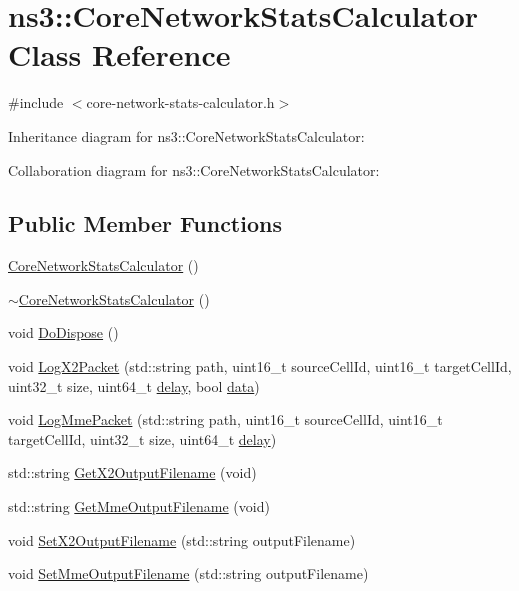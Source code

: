 \hypertarget{classns3_1_1CoreNetworkStatsCalculator}{}\section{ns3\+:\+:Core\+Network\+Stats\+Calculator Class Reference}
\label{classns3_1_1CoreNetworkStatsCalculator}


{\ttfamily \#include $<$core-\/network-\/stats-\/calculator.\+h$>$}



Inheritance diagram for ns3\+:\+:Core\+Network\+Stats\+Calculator\+:


Collaboration diagram for ns3\+:\+:Core\+Network\+Stats\+Calculator\+:
\subsection*{Public Member Functions}
\begin{DoxyCompactItemize}
\item 
\hyperlink{classns3_1_1CoreNetworkStatsCalculator_ad42faed58e88f2da64ee5d6feec4532d}{Core\+Network\+Stats\+Calculator} ()
\item 
\hyperlink{classns3_1_1CoreNetworkStatsCalculator_ae06dda03760bf6e5a90156b94318b368}{$\sim$\+Core\+Network\+Stats\+Calculator} ()
\item 
void \hyperlink{classns3_1_1CoreNetworkStatsCalculator_aa6f9df22b3639d8ddf8e125d7dac9859}{Do\+Dispose} ()
\item 
void \hyperlink{classns3_1_1CoreNetworkStatsCalculator_a4ad926aa72b89e4ff8708c971435f8f9}{Log\+X2\+Packet} (std\+::string path, uint16\+\_\+t source\+Cell\+Id, uint16\+\_\+t target\+Cell\+Id, uint32\+\_\+t size, uint64\+\_\+t \hyperlink{mmwave_2model_2fading-traces_2fading__trace__generator_8m_a7964e6aa8f61a9d28973c8267a606ad8}{delay}, bool \hyperlink{topology-example-sim_8cc_a26c65296e316af77b787dc77469bb2a4}{data})
\item 
void \hyperlink{classns3_1_1CoreNetworkStatsCalculator_a76a8fab42a44b67f1d159ae67c22b08e}{Log\+Mme\+Packet} (std\+::string path, uint16\+\_\+t source\+Cell\+Id, uint16\+\_\+t target\+Cell\+Id, uint32\+\_\+t size, uint64\+\_\+t \hyperlink{mmwave_2model_2fading-traces_2fading__trace__generator_8m_a7964e6aa8f61a9d28973c8267a606ad8}{delay})
\item 
std\+::string \hyperlink{classns3_1_1CoreNetworkStatsCalculator_a483c45580b0fdb562a4eb518d3650bdc}{Get\+X2\+Output\+Filename} (void)
\item 
std\+::string \hyperlink{classns3_1_1CoreNetworkStatsCalculator_a52e290762d7a7f3c9f4c757ac8ca2516}{Get\+Mme\+Output\+Filename} (void)
\item 
void \hyperlink{classns3_1_1CoreNetworkStatsCalculator_a8a9f940e8f4b4fa2d3d0e96f5f1ca71b}{Set\+X2\+Output\+Filename} (std\+::string output\+Filename)
\item 
void \hyperlink{classns3_1_1CoreNetworkStatsCalculator_a3fa66247ee07ae338a619e88174d4581}{Set\+Mme\+Output\+Filename} (std\+::string output\+Filename)
\end{DoxyCompactItemize}
